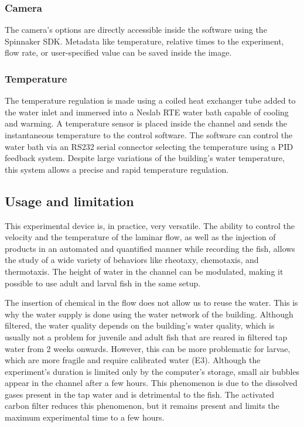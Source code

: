   \subsubsection{Camera}
  The camera's options are directly accessible inside the software using the Spinnaker SDK. Metadata like temperature, relative times to the experiment, flow rate, or user-specified value can be saved inside the image.

  \subsubsection{Temperature}
  The temperature regulation is made using a coiled heat exchanger tube added to the water inlet and immersed into a Neslab RTE water bath capable of cooling and warming. A temperature sensor is placed inside the channel and sends the instantaneous temperature to the control software. The software can control the water bath via an RS232 serial connector selecting the temperature using a PID feedback system. Despite large variations of the building's water temperature, this system allows a precise and rapid temperature regulation.

  \subsection{Usage and limitation}
  This experimental device is, in practice, very versatile. The ability to control the velocity and the temperature of the laminar flow, as well as the injection of products in an automated and quantified manner while recording the fish, allows the study of a wide variety of behaviors like rheotaxy, chemotaxis, and thermotaxis. The height of water in the channel can be modulated, making it possible to use adult and larval fish in the same setup.

  The insertion of chemical in the flow does not allow us to reuse the water. This is why the water supply is done using the water network of the building. Although filtered, the water quality depends on the building's water quality, which is usually not a problem for juvenile and adult fish that are reared in filtered tap water from 2 weeks onwards. However, this can be more problematic for larvae, which are more fragile and require calibrated water (E3). Although the experiment's duration is limited only by the computer's storage, small air bubbles appear in the channel after a few hours. This phenomenon is due to the dissolved gases present in the tap water and is detrimental to the fish. The activated carbon filter reduces this phenomenon, but it remains present and limits the maximum experimental time to a few hours.

